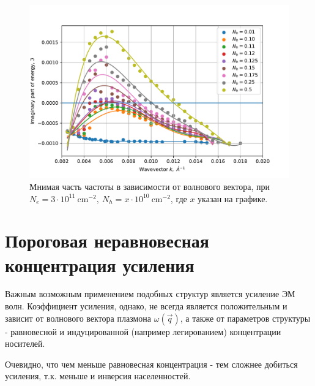 \documentclass[../main.tex]{subfiles}
\begin{document}
    \begin{figure}[h]
        \begin{minipage}[h]{1\textwidth}
            \includegraphics[width=1\textwidth]{./images/plazmon6nm3neXnpim.pdf}
            \caption{Мнимая часть частоты в зависимости от волнового вектора, при 
            $N_e = 3 \cdot 10^{11}~\text{cm}^{-2},~N_h = x \cdot 10^{10}~\text{cm}^{-2}$,
            где $x$ указан на графике.\label{plasmon:6nm3neXnpim}}
        \end{minipage}
    \end{figure}

    \section{Пороговая неравновесная концентрация усиления}

    Важным возможным применением подобных структур является усиление ЭМ волн. 
    Коэффициент усиления, однако, не всегда является положительным и 
    зависит от волнового вектора плазмона $\omega(\vec q)$, 
    а также от параметров структуры - равновесной и индуцированной 
    (например легированием) концентрации носителей. 

    Очевидно, что чем меньше равновесная концентрация - тем 
    сложнее добиться усиления, т.к. меньше и инверсия населенностей.

\end{document}
